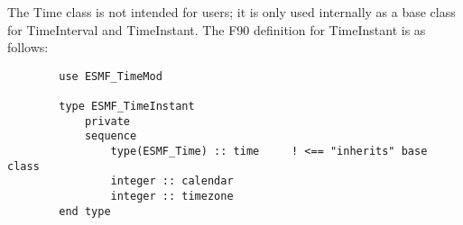 
The Time class is not intended for users; it is only used internally as a base
class for TimeInterval and TimeInstant.  The F90 definition for
TimeInstant is as follows:

\begin{verbatim}
        use ESMF_TimeMod

        type ESMF_TimeInstant
            private
            sequence
                type(ESMF_Time) :: time		! <== "inherits" base class
                integer :: calendar
                integer :: timezone
        end type
\end{verbatim}
